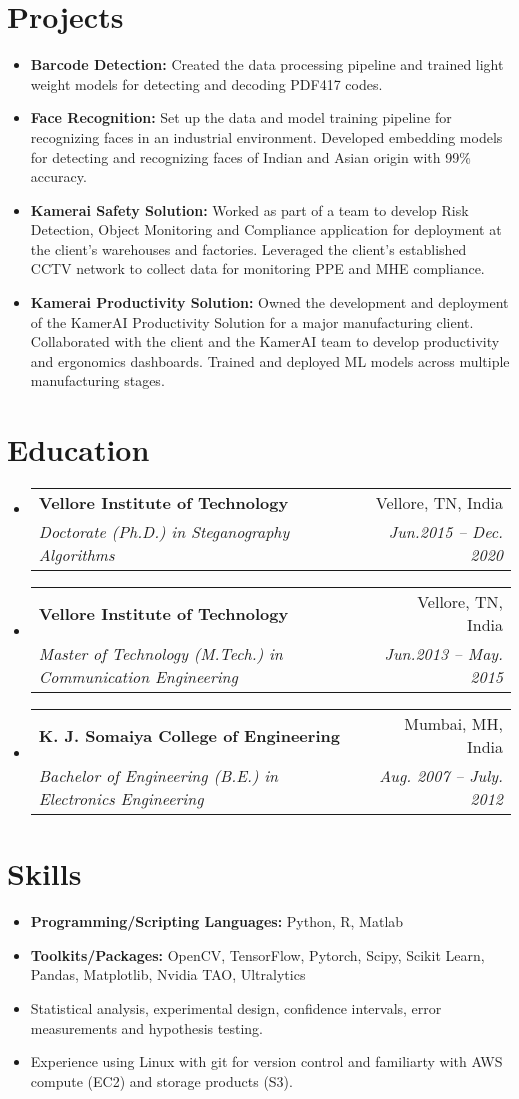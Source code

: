 \documentclass[a4paper,11pt]{article}
\makeatletter
\newcommand{\resumeSubheading}[4]{
  \vspace{-1pt}\item
    \begin{tabular*}{0.97\textwidth}[t]{l@{\extracolsep{\fill}}r}
      \textbf{#1} & #2 \\
      \textit{\small#3} & \textit{\small #4} \\
    \end{tabular*}\vspace{-5pt}
}
\newcommand{\resumeSubHeadingListStart}{\begin{itemize}[leftmargin=*]}
\newcommand{\resumeSubHeadingListEnd}{\end{itemize}}
\makeatother
\begin{document}
\section{Projects}
  \begin{itemize}[leftmargin=*, itemsep = -2pt]
    \item {\textbf{Barcode Detection:} Created the data processing pipeline and trained light weight models for detecting and decoding PDF417 codes.}
    \item {\textbf{Face Recognition:} Set up the data and model training pipeline for recognizing faces in an industrial environment. Developed embedding models for detecting and recognizing faces of Indian and Asian origin with 99\% accuracy.}
    \item {\textbf{Kamerai Safety Solution:} Worked as part of a team to develop Risk Detection, Object Monitoring and Compliance application for deployment at the client's warehouses and factories. Leveraged the client's established CCTV network to collect data for monitoring PPE and MHE compliance.}
    \item {\textbf{Kamerai Productivity Solution:} Owned the development and deployment of the KamerAI Productivity Solution for a major manufacturing client. Collaborated with the client and the KamerAI team to develop productivity and ergonomics dashboards. Trained and deployed ML models across multiple manufacturing stages.}
  \end{itemize}

\section{Education}
  \resumeSubHeadingListStart
    \resumeSubheading
      {Vellore Institute of Technology}{Vellore, TN, India}
      {Doctorate (Ph.D.) in Steganography Algorithms}{Jun.2015 -- Dec. 2020}
    \resumeSubheading
      {Vellore Institute of Technology}{Vellore, TN, India}
      {Master of Technology (M.Tech.) in Communication Engineering}{Jun.2013 -- May. 2015}
    \resumeSubheading
      {K. J. Somaiya College of Engineering}{Mumbai, MH, India}
      {Bachelor of Engineering (B.E.) in Electronics Engineering}{Aug. 2007 -- July. 2012}
  \resumeSubHeadingListEnd

\section{Skills}
	\begin{itemize}[leftmargin=*, itemsep = -2pt]
		\item{\textbf{Programming/Scripting Languages:}{ Python, R, Matlab}}
		\item{\textbf{Toolkits/Packages:}{ OpenCV, TensorFlow, Pytorch, Scipy, Scikit Learn, Pandas, Matplotlib, Nvidia TAO, Ultralytics}}
		\item{Statistical analysis, experimental design, confidence intervals, error measurements and hypothesis testing.}
    \item{Experience using Linux with git for version control and familiarty with AWS compute (EC2) and storage products (S3).}
	\end{itemize}
\end{document}
